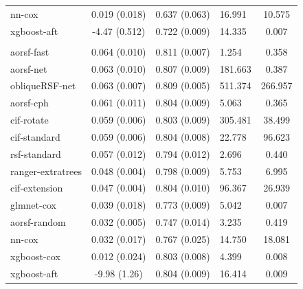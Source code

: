 \documentclass[twoside,11pt]{article}\usepackage[]{graphicx}\usepackage[]{xcolor}
\newenvironment{knitrout}{}{} %
\begin{document}
\begin{knitrout}
\begin{longtable}[t]{lcclc}
\hspace{1em}nn-cox & 0.019 (0.018) & 0.637 (0.063) & 16.991 & 10.575\\
\hspace{1em}xgboost-aft & -4.47 (0.512) & 0.722 (0.009) & 14.335 & 0.007\\
\addlinespace[0.3em]
\hline
\multicolumn{5}{l}{\textit{\textbf{MESA; coronary heart disease, n = 6785, p = 48}}}\\
\hline
\hspace{1em}aorsf-fast & 0.064 (0.010) & 0.811 (0.007) & 1.254 & 0.358\\
\hspace{1em}aorsf-net & 0.063 (0.010) & 0.807 (0.009) & 181.663 & 0.387\\
\hspace{1em}obliqueRSF-net & 0.063 (0.007) & 0.809 (0.005) & 511.374 & 266.957\\
\hspace{1em}aorsf-cph & 0.061 (0.011) & 0.804 (0.009) & 5.063 & 0.365\\
\hspace{1em}cif-rotate & 0.059 (0.006) & 0.803 (0.009) & 305.481 & 38.499\\
\hspace{1em}cif-standard & 0.059 (0.006) & 0.804 (0.008) & 22.778 & 96.623\\
\hspace{1em}rsf-standard & 0.057 (0.012) & 0.794 (0.012) & 2.696 & 0.440\\
\hspace{1em}ranger-extratrees & 0.048 (0.004) & 0.798 (0.009) & 5.753 & 6.995\\
\hspace{1em}cif-extension & 0.047 (0.004) & 0.804 (0.010) & 96.367 & 26.939\\
\hspace{1em}glmnet-cox & 0.039 (0.018) & 0.773 (0.009) & 5.042 & 0.007\\
\hspace{1em}aorsf-random & 0.032 (0.005) & 0.747 (0.014) & 3.235 & 0.419\\
\hspace{1em}nn-cox & 0.032 (0.017) & 0.767 (0.025) & 14.750 & 18.081\\
\hspace{1em}xgboost-cox & 0.012 (0.024) & 0.803 (0.008) & 4.399 & 0.008\\
\hspace{1em}xgboost-aft & -9.98 (1.26) & 0.804 (0.009) & 16.414 & 0.009\\

\end{longtable}
\end{knitrout}
\end{document}
